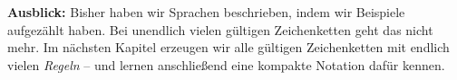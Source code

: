 \documentclass[11pt,a4paper]{article}
\begin{document}
\begin{hinweis}\small
\textbf{Ausblick:} Bisher haben wir Sprachen beschrieben, indem wir Beispiele aufgezählt haben. Bei unendlich vielen gültigen Zeichenketten geht das nicht mehr. Im nächsten Kapitel erzeugen wir alle gültigen Zeichenketten mit endlich vielen \emph{Regeln} -- und lernen anschließend eine kompakte Notation dafür kennen.
\end{hinweis}

\end{document}
